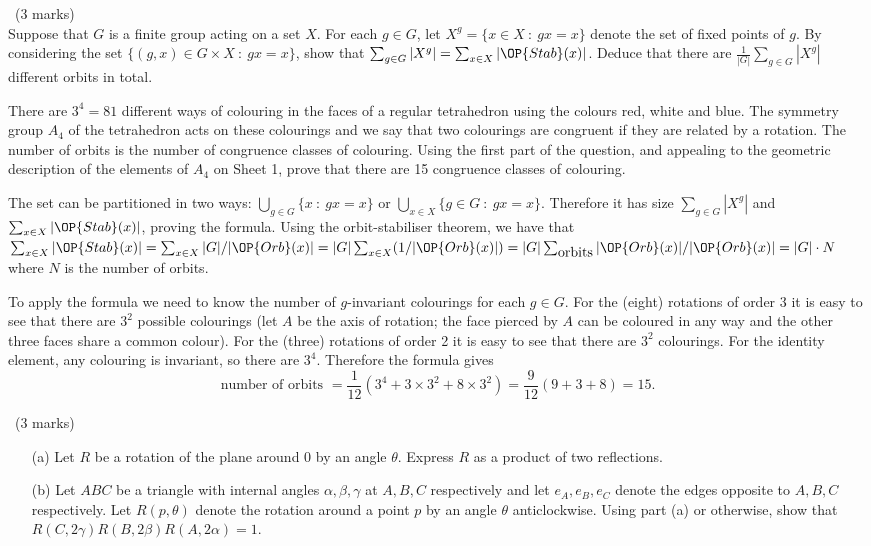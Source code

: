 \documentclass[12pt]{article}
\begin{document}
\newpage

\begin{question}\ (3 marks)\\
  Suppose that $G$ is a finite group acting on a set $X$. For each $g\in G$, let $X^g=\{x\in X\ :\ gx=x\}$ denote the set of fixed points of $g$. By considering the set $\{(g,x)\in G\times X\ :\ gx=x\}$, show that $\sum_{g\in G}|X^g|=\sum_{x\in X}|\OP{Stab}(x)|$. Deduce that there are $\frac{1}{|G|}\sum_{g\in G}|X^g|$ different orbits in total.

  There are $3^4=81$ different ways of colouring in the faces of a regular tetrahedron using the colours red, white and blue. The symmetry group $A_4$ of the tetrahedron acts on these colourings and we say that two colourings are congruent if they are related by a rotation. The number of orbits is the number of congruence classes of colouring. Using the first part of the question, and appealing to the geometric description of the elements of $A_4$ on Sheet 1, prove that there are 15 congruence classes of colouring.
\end{question}

\begin{answer}
  The set can be partitioned in two ways: $\bigcup_{g\in G}\{x\ :\ gx=x\}$ or $\bigcup_{x\in X}\{g\in G\ :\ gx=x\}$. Therefore it has size $\sum_{g\in G}|X^g|$ and $\sum_{x\in X}|\OP{Stab}(x)|$, proving the formula. Using the orbit-stabiliser theorem, we have that $\sum_{x\in X}|\OP{Stab}(x)|=\sum_{x\in X}|G|/|\OP{Orb}(x)|=|G|\sum_{x\in X}(1/|\OP{Orb}(x)|)=|G|\sum_{\mbox{orbits}}|\OP{Orb}(x)|/|\OP{Orb}(x)|=|G|\cdot N$ where $N$ is the number of orbits.

  To apply the formula we need to know the number of $g$-invariant colourings for each $g\in G$. For the (eight) rotations of order 3 it is easy to see that there are $3^2$ possible colourings (let $A$ be the axis of rotation; the face pierced by $A$ can be coloured in any way and the other three faces share a common colour). For the (three) rotations of order 2 it is easy to see that there are $3^2$ colourings. For the identity element, any colouring is invariant, so there are $3^4$. Therefore the formula gives
  \[\mbox{number of orbits }=\frac{1}{12}(3^4+3\times 3^2+8\times 3^2)=\frac{9}{12}(9+3+8)=15.\]
\end{answer}
\newpage

\vspace{1cm}

\begin{question}\ (3 marks)
  \begin{enumerate}
  \item[(a)] Let $R$ be a rotation of the plane around 0 by an angle $\theta$. Express $R$ as a product of two reflections.
  \item[(b)] Let $ABC$ be a triangle with internal angles $\alpha,\beta,\gamma$ at $A,B,C$ respectively and let $e_A,e_B,e_C$ denote the edges opposite to $A,B,C$ respectively. Let $R(p,\theta)$ denote the rotation around a point $p$ by an angle $\theta$ anticlockwise. Using part (a) or otherwise, show that $R(C,2\gamma)R(B,2\beta)R(A,2\alpha)=1$.
  \end{enumerate}
\end{question}
\end{document}
